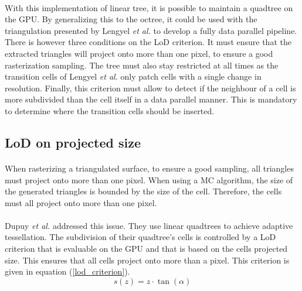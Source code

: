 \paragraph{}
With this implementation of linear tree, it is possible to maintain a quadtree on the GPU.
By generalizing this to the octree, it could be used with the triangulation presented by Lengyel \textit{et al.} to develop a fully data parallel pipeline.
There is however three conditions on the LoD criterion.
It must ensure that the extracted triangles will project onto more than one pixel, to ensure a good rasterization sampling.
The tree must also stay restricted at all times as the transition cells of Lengyel \textit{et al.} only patch cells with a single change in resolution.
Finally, this criterion must allow to detect if the neighbour of a cell is more subdivided than the cell itself in a data parallel manner.
This is mandatory to determine where the transition cells should be inserted.


\subsection{LoD on projected size}

\paragraph{}
When rasterizing a triangulated surface, to ensure a good sampling, all triangles must project onto more than one pixel.
When using a MC algorithm, the size of the generated triangles is bounded by the size of the cell.
Therefore, the cells must all project onto more than one pixel.

\paragraph{}
Dupuy \textit{et al.} \cite{dupuy2014quadtrees} addressed this issue.
They use linear quadtrees to achieve adaptive tessellation.
The subdivision of their quadtree's cells is controlled by a LoD criterion that is evaluable on the GPU and that is based on the cells projected size.
This ensures that all cells project onto more than a pixel.
This criterion is given in equation (\ref{lod_criterion}).
\\
\begin{equation}
s(z) = z \cdot \tan(\alpha)
\label{lod_criterion}
\end{equation}

